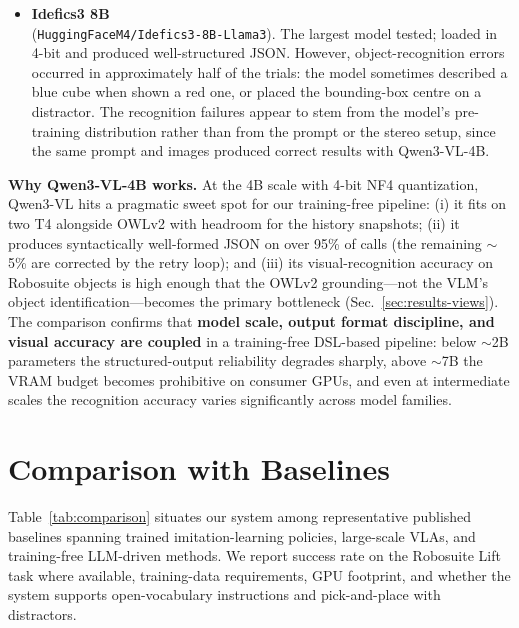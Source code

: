 \documentclass[conference]{IEEEtran}
\begin{document}
\begin{itemize}
\item \textbf{Idefics3 8B} \\(\texttt{HuggingFaceM4/Idefics3-8B-Llama3}). The largest model tested; loaded in 4-bit and produced well-structured JSON. However, object-recognition errors occurred in approximately half of the trials: the model sometimes described a blue cube when shown a red one, or placed the bounding-box centre on a distractor. The recognition failures appear to stem from the model's pre-training distribution rather than from the prompt or the stereo setup, since the same prompt and images produced correct results with Qwen3-VL-4B.
\end{itemize}

\textbf{Why Qwen3-VL-4B works.} At the 4B scale with 4-bit NF4 quantization, Qwen3-VL hits a pragmatic sweet spot for our training-free pipeline: (i) it fits on two T4 alongside OWLv2 with headroom for the history snapshots; (ii) it produces syntactically well-formed JSON on over 95\% of calls (the remaining $\sim$5\% are corrected by the retry loop); and (iii) its visual-recognition accuracy on Robosuite objects is high enough that the OWLv2 grounding---not the VLM's object identification---becomes the primary bottleneck (Sec.~\ref{sec:results-views}). The comparison confirms that \textbf{model scale, output format discipline, and visual accuracy are coupled} in a training-free DSL-based pipeline: below $\sim$2B parameters the structured-output reliability degrades sharply, above $\sim$7B the VRAM budget becomes prohibitive on consumer GPUs, and even at intermediate scales the recognition accuracy varies significantly across model families.

\section{Comparison with Baselines}
\label{sec:comparison}

Table~\ref{tab:comparison} situates our system among representative published baselines spanning trained imitation-learning policies, large-scale VLAs, and training-free LLM-driven methods. We report success rate on the Robosuite Lift task where available, training-data requirements, GPU footprint, and whether the system supports open-vocabulary instructions and pick-and-place with distractors.
\end{document}
